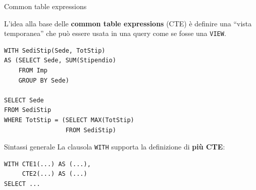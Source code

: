 \documentclass[aspectratio=169]{beamer}
\begin{document}
\begin{frame}[fragile]{Common table expressions}

L'idea alla base delle \textbf{common table expressions} (CTE) è definire una ``vista temporanea'' che può essere usata in una query come se fosse una \texttt{VIEW}.

\begin{lstlisting}
WITH SediStip(Sede, TotStip)
AS (SELECT Sede, SUM(Stipendio)
    FROM Imp
    GROUP BY Sede)

SELECT Sede
FROM SediStip
WHERE TotStip = (SELECT MAX(TotStip)
                 FROM SediStip)
\end{lstlisting}

\begin{block}{Sintassi generale}
La clausola \texttt{WITH} supporta la definizione di \textbf{più CTE}:
\begin{lstlisting}
WITH CTE1(...) AS (...),
     CTE2(...) AS (...)
SELECT ...
\end{lstlisting}
\end{block}

\end{frame}
\end{document}
